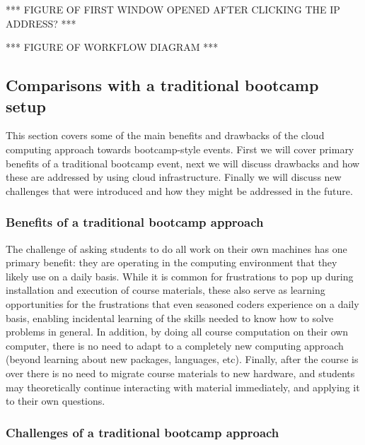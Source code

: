 \begin{enumerate}
*** FIGURE OF FIRST WINDOW OPENED AFTER CLICKING THE IP ADDRESS? ***

\end{enumerate}

*** FIGURE OF WORKFLOW DIAGRAM ***

\subsection{Comparisons with a traditional bootcamp setup}

This section covers some of the main benefits and drawbacks of the cloud
computing approach towards bootcamp-style events. First we will cover primary
benefits of a traditional bootcamp event, next we will discuss drawbacks and how
these are addressed by using cloud infrastructure. Finally we will discuss new
challenges that were introduced and how they might be addressed in the future.

\subsubsection{Benefits of a traditional bootcamp approach}

The challenge of asking students to do all work on their own machines has one
primary benefit: they are operating in the computing environment that they
likely use on a daily basis. While it is common for frustrations to pop up
during installation and execution of course materials, these also serve as
learning opportunities for the frustrations that even seasoned coders experience
on a daily basis, enabling incidental learning of the skills needed to know how
to solve problems in general. In addition, by doing all course computation on
their own computer, there is no need to adapt to a completely new computing
approach (beyond learning about new packages, languages, etc). Finally, after
the course is over there is no need to migrate course materials to new hardware,
and students may theoretically continue interacting with material immediately,
and applying it to their own questions.

\subsubsection{Challenges of a traditional bootcamp approach}

